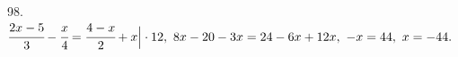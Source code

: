 98. $\cfrac{2x-5}{3}-\cfrac{x}{4}=\cfrac{4-x}{2}+x\Big|\cdot12,\ 8x-20-3x=24-6x+12x,\ -x=44,\ x=-44.$\\
